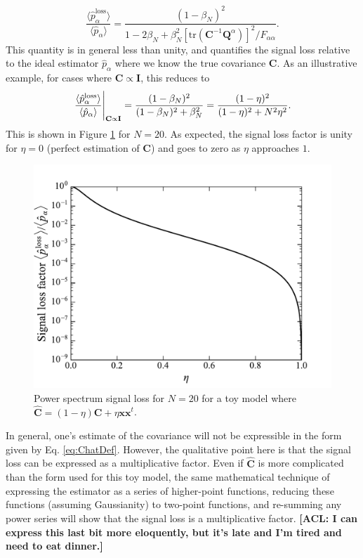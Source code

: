 \documentclass[preprint2,numberedappendix,tighten]{aastex6}  %
\newcommand{\x}{\mathbf{x}}
\newcommand{\C}{\mathbf{C}}
\newcommand{\Chat}{\mathbf{\hat{C}}}
\newcommand{\Q}{\mathbf{Q}}
\newcommand{\I}{\mathbf{I}}
\newcommand{\acl}[1]{{\color{red} \textbf{[ACL:  #1]}}}
\begin{document}
\begin{equation}
\frac{\langle \hat{p}_\alpha^\textrm{loss} \rangle}{\langle \hat{p}_\alpha \rangle} = \frac{(1-\beta_N)^2}{1- 2\beta_N + \beta_N^2 \left[ \textrm{tr} (\C^{-1} \Q^\alpha) \right]^2 / F_{\alpha \alpha}}.
\end{equation}
This quantity is in general less than unity, and quantifies the signal loss relative to the ideal estimator $\hat{p}_\alpha$ where we know the true covariance $\C$. As an illustrative example, for cases where $\C \propto \I$, this reduces to
\begin{equation}
\frac{\langle \hat{p}_\alpha^\textrm{loss} \rangle}{\langle \hat{p}_\alpha \rangle} \Bigg{|}_{\C \propto \I} = \frac{(1-\beta_N)^2}{(1-\beta_N)^2 + \beta_N^2} = \frac{(1-\eta)^2}{(1-\eta)^2 + N^2 \eta^2}.
\end{equation}
This is shown in Figure \ref{fig:analytic_sig_loss} for $N=20$. As expected, the signal loss factor is unity for $\eta=0$ (perfect estimation of $\C$) and goes to zero as $\eta$ approaches $1$.
\begin{figure}
	\centering
	\includegraphics[width=0.6\columnwidth]{plots/analytic_sig_loss.pdf}
	\caption{Power spectrum signal loss for $N=20$ for a toy model where $\Chat = (1-\eta) \C + \eta \x \x^t$.}
	\label{fig:analytic_sig_loss}
\end{figure}

In general, one's estimate of the covariance will not be expressible in the form given by Eq. \eqref{eq:ChatDef}. However, the qualitative point here is that the signal loss can be expressed as a multiplicative factor. Even if $\Chat$ is more complicated than the form used for this toy model, the same mathematical technique of expressing the estimator as a series of higher-point functions, reducing these functions (assuming Gaussianity) to two-point functions, and re-summing any power series will show that the signal loss is a multiplicative factor. \acl{I can express this last bit more eloquently, but it's late and I'm tired and need to eat dinner.}




\end{document}
